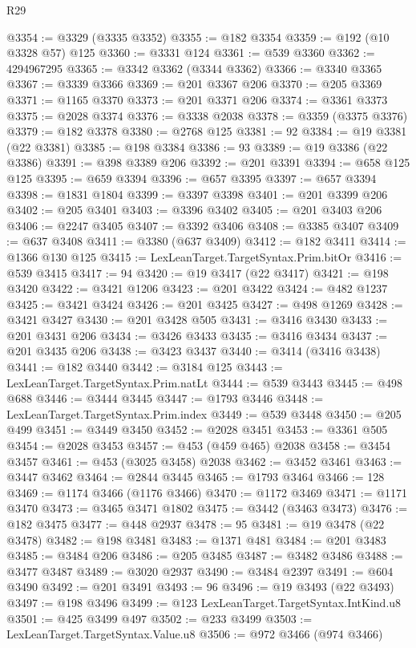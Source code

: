 \begin{lexlean}{R29}
\begin{coremodule}
@3354 := @3329 (@3335 @3352)
@3355 := @182 @3354
@3359 := @192 (@10 @3328 @57) @125
@3360 := @3331 @124
@3361 := @539 @3360
@3362 := 4294967295
@3365 := @3342 @3362 (@3344 @3362)
@3366 := @3340 @3365
@3367 := @3339 @3366
@3369 := @201 @3367 @206
@3370 := @205 @3369
@3371 := @1165 @3370
@3373 := @201 @3371 @206
@3374 := @3361 @3373
@3375 := @2028 @3374
@3376 := @3338 @2038
@3378 := @3359 (@3375 @3376)
@3379 := @182 @3378
@3380 := @2768 @125
@3381 := 92
@3384 := @19 @3381 (@22 @3381)
@3385 := @198 @3384
@3386 := 93
@3389 := @19 @3386 (@22 @3386)
@3391 := @398 @3389 @206
@3392 := @201 @3391
@3394 := @658 @125 @125
@3395 := @659 @3394
@3396 := @657 @3395
@3397 := @657 @3394
@3398 := @1831 @1804
@3399 := @3397 @3398
@3401 := @201 @3399 @206
@3402 := @205 @3401
@3403 := @3396 @3402
@3405 := @201 @3403 @206
@3406 := @2247 @3405
@3407 := @3392 @3406
@3408 := @3385 @3407
@3409 := @637 @3408
@3411 := @3380 (@637 @3409)
@3412 := @182 @3411
@3414 := @1366 @130 @125
@3415 := LexLeanTarget.TargetSyntax.Prim.bitOr
@3416 := @539 @3415
@3417 := 94
@3420 := @19 @3417 (@22 @3417)
@3421 := @198 @3420
@3422 := @3421 @1206
@3423 := @201 @3422
@3424 := @482 @1237
@3425 := @3421 @3424
@3426 := @201 @3425
@3427 := @498 @1269
@3428 := @3421 @3427
@3430 := @201 @3428 @505
@3431 := @3416 @3430
@3433 := @201 @3431 @206
@3434 := @3426 @3433
@3435 := @3416 @3434
@3437 := @201 @3435 @206
@3438 := @3423 @3437
@3440 := @3414 (@3416 @3438)
@3441 := @182 @3440
@3442 := @3184 @125
@3443 := LexLeanTarget.TargetSyntax.Prim.natLt
@3444 := @539 @3443
@3445 := @498 @688
@3446 := @3444 @3445
@3447 := @1793 @3446
@3448 := LexLeanTarget.TargetSyntax.Prim.index
@3449 := @539 @3448
@3450 := @205 @499
@3451 := @3449 @3450
@3452 := @2028 @3451
@3453 := @3361 @505
@3454 := @2028 @3453
@3457 := @453 (@459 @465) @2038
@3458 := @3454 @3457
@3461 := @453 (@3025 @3458) @2038
@3462 := @3452 @3461
@3463 := @3447 @3462
@3464 := @2844 @3445
@3465 := @1793 @3464
@3466 := 128
@3469 := @1174 @3466 (@1176 @3466)
@3470 := @1172 @3469
@3471 := @1171 @3470
@3473 := @3465 @3471 @1802
@3475 := @3442 (@3463 @3473)
@3476 := @182 @3475
@3477 := @448 @2937
@3478 := 95
@3481 := @19 @3478 (@22 @3478)
@3482 := @198 @3481
@3483 := @1371 @481
@3484 := @201 @3483
@3485 := @3484 @206
@3486 := @205 @3485
@3487 := @3482 @3486
@3488 := @3477 @3487
@3489 := @3020 @2937
@3490 := @3484 @2397
@3491 := @604 @3490
@3492 := @201 @3491
@3493 := 96
@3496 := @19 @3493 (@22 @3493)
@3497 := @198 @3496
@3499 := @123 LexLeanTarget.TargetSyntax.IntKind.u8
@3501 := @425 @3499 @497
@3502 := @233 @3499
@3503 := LexLeanTarget.TargetSyntax.Value.u8
@3506 := @972 @3466 (@974 @3466)

\end{coremodule}
\end{lexlean}
